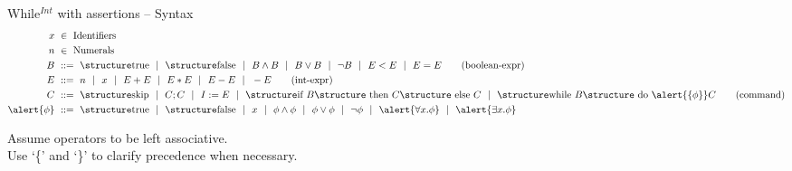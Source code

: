 \documentclass[aspectratio=169]{beamer}
\begin{document}
\begin{slide}{While$^{Int}$ with assertions -- Syntax}
\small
\begin{align*}
  x &~\in~ \text{Identifiers}
  \\
  n &~\in~ \text{Numerals}
  \\
  B &~::=~ \kw{true} ~~|~~ \kw{false} ~~|~~ B \land B ~~|~~ B \lor B ~~|~~ \lnot B ~~|~~ E<E ~~|~~ E=E
  \tag{boolean-expr}\\
  E &~::=~ n ~~|~~ x ~~|~~ E+E ~~|~~ E*E ~~|~~ E-E ~~|~~ -E
  \tag{int-expr}\\
  C &~::=~ \kw {skip} ~~|~~ C;C ~~|~~ I:=E
    ~~|~~  \kw{if } B \kw{ then } C\kw{ else }C ~~|~~  \kw{while }B\kw{ do }\alert{\{\phi\}}C
  \tag{command}\\
  \alert{\phi} &~::=~ \kw{true} ~~|~~ \kw{false} ~~|~~ x ~~|~~ \phi \land \phi ~~|~~ \phi \lor \phi ~~|~~ \lnot \phi
    ~~|~~ \alert{\forall x.\phi} ~~|~~ \alert{\exists x.\phi}
\end{align*}

Assume operators to be left associative.
\\Use `\{' and `\}' to clarify precedence when necessary.

\end{slide}
\end{document}
